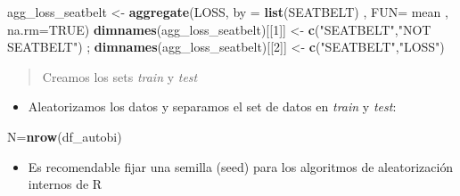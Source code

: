 \documentclass[]{book}
\newenvironment{Shaded}{\begin{snugshade}}{\end{snugshade}}
\newcommand{\CommentTok}[1]{\textcolor[rgb]{0.56,0.35,0.01}{\textit{#1}}}
\newcommand{\ControlFlowTok}[1]{\textcolor[rgb]{0.13,0.29,0.53}{\textbf{#1}}}
\newcommand{\DataTypeTok}[1]{\textcolor[rgb]{0.13,0.29,0.53}{#1}}
\newcommand{\DecValTok}[1]{\textcolor[rgb]{0.00,0.00,0.81}{#1}}
\newcommand{\FloatTok}[1]{\textcolor[rgb]{0.00,0.00,0.81}{#1}}
\newcommand{\KeywordTok}[1]{\textcolor[rgb]{0.13,0.29,0.53}{\textbf{#1}}}
\newcommand{\NormalTok}[1]{#1}
\newcommand{\OperatorTok}[1]{\textcolor[rgb]{0.81,0.36,0.00}{\textbf{#1}}}
\newcommand{\OtherTok}[1]{\textcolor[rgb]{0.56,0.35,0.01}{#1}}
\newcommand{\StringTok}[1]{\textcolor[rgb]{0.31,0.60,0.02}{#1}}
\providecommand{\tightlist}{%
  \setlength{\itemsep}{0pt}\setlength{\parskip}{0pt}}
\begin{document}
\begin{Shaded}
\begin{Highlighting}[]
\NormalTok{  agg_loss_seatbelt <-}\StringTok{ }\KeywordTok{aggregate}\NormalTok{(LOSS, }\DataTypeTok{by =} \KeywordTok{list}\NormalTok{(SEATBELT) , }\DataTypeTok{FUN=}\NormalTok{ mean , }\DataTypeTok{na.rm=}\OtherTok{TRUE}\NormalTok{)}
  \KeywordTok{dimnames}\NormalTok{(agg_loss_seatbelt)[[}\DecValTok{1}\NormalTok{]] <-}\StringTok{ }\KeywordTok{c}\NormalTok{(}\StringTok{"SEATBELT"}\NormalTok{,}\StringTok{"NOT SEATBELT"}\NormalTok{) ; }\KeywordTok{dimnames}\NormalTok{(agg_loss_seatbelt)[[}\DecValTok{2}\NormalTok{]] <-}\StringTok{ }\KeywordTok{c}\NormalTok{(}\StringTok{"SEATBELT"}\NormalTok{,}\StringTok{"LOSS"}\NormalTok{)}
\end{Highlighting}
\end{Shaded}

\begin{quote}
Creamos los sets \emph{train} y \emph{test}
\end{quote}

\begin{itemize}
\tightlist
\item
  Aleatorizamos los datos y separamos el set de datos en \emph{train} y \emph{test}:
\end{itemize}

\begin{Shaded}
\begin{Highlighting}[]
\NormalTok{N=}\KeywordTok{nrow}\NormalTok{(df_autobi)}
\end{Highlighting}
\end{Shaded}

\begin{itemize}
\tightlist
\item
  Es recomendable fijar una semilla (seed) para los algoritmos de aleatorización internos de R
\end{itemize}

\begin{Shaded}
\end{Shaded}
\end{document}
